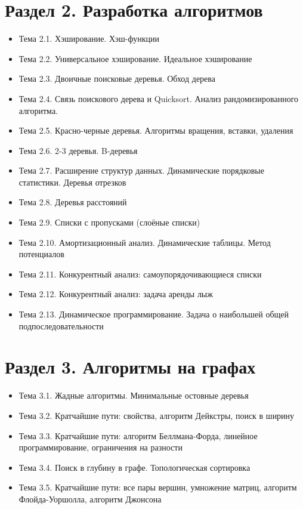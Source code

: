 \documentclass[a4paper,11pt]{article}
\begin{document}
\section*{Раздел 2. Разработка алгоритмов}
\begin{itemize}
\item Тема 2.1. Хэширование. Хэш-функции
\item Тема 2.2. Универсальное хэширование. Идеальное хэширование
\item Тема 2.3. Двоичные поисковые деревья. Обход дерева
\item Тема 2.4. Связь поискового дерева и Quicksort. Анализ рандомизированного алгоритма.
\item Тема 2.5. Красно-черные деревья. Алгоритмы вращения, вставки, удаления
\item Тема 2.6. 2-3 деревья. B-деревья
\item Тема 2.7. Расширение структур данных. Динамические порядковые статистики. Деревья отрезков
\item Тема 2.8. Деревья расстояний
\item Тема 2.9. Списки с пропусками (слоёные списки)
\item Тема 2.10. Амортизационный анализ. Динамические таблицы. Метод потенциалов
\item Тема 2.11. Конкурентный анализ: самоупорядочивающиеся списки
\item Тема 2.12. Конкурентный анализ: задача аренды лыж
\item Тема 2.13. Динамическое программирование. Задача о наибольшей общей подпоследовательности
\end{itemize}
\section*{Раздел 3. Алгоритмы на графах}
\begin{itemize}
\item Тема 3.1. Жадные алгоритмы. Минимальные остовные деревья
\item Тема 3.2. Кратчайшие пути: свойства, алгоритм Дейкстры, поиск в ширину
\item Тема 3.3. Кратчайшие пути: алгоритм Беллмана-Форда, линейное программирование, ограничения на разности
\item Тема 3.4. Поиск в глубину в графе. Топологическая сортировка
\item Тема 3.5. Кратчайшие пути: все пары вершин, умножение матриц, алгоритм Флойда-Уоршолла, алгоритм Джонсона
\end{itemize}
\end{document}
